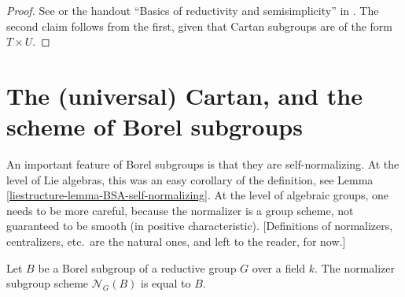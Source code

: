 \begin{proof}
See \cite[\S 13.17, Corollary 2]{Borel-LAG} or the handout ``Basics of reductivity and semisimplicity'' in \cite{Conrad-AG2}. The second claim follows from the first, given that Cartan subgroups are of the form $T\times U$.
\end{proof}


\section{The (universal) Cartan, and the scheme of Borel subgroups}
\label{section-universal-Cartan}



An important feature of Borel subgroups is that they are self-normalizing. At the level of Lie algebras, this was an easy corollary of the definition, see Lemma \ref{liestructure-lemma-BSA-self-normalizing}. At the level of algebraic groups, one needs to be more careful, because the normalizer is a group scheme, not guaranteed to be smooth (in positive characteristic). [Definitions of normalizers, centralizers, etc.\ are the natural ones, and left to the reader, for now.]


\begin{theorem}
 \label{theorem-Borel-self-normalizing}
Let $B$ be a Borel subgroup of a reductive group $G$ over a field $k$. The normalizer subgroup scheme $\mathcal N_G(B)$ is equal to $B$. 
\end{theorem}

